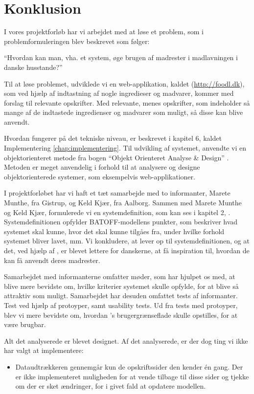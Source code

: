 \chapter{Konklusion}
\label{chap:konklusion}

I vores projektforløb har vi arbejdet med at løse et problem, som i problemformuleringen blev beskrevet som følger:

``Hvordan kan man, vha. et system, øge brugen af madrester i madlavningen i danske husstande?''

Til at løse problemet, udviklede vi en web-applikation, kaldet \Foodl{} (\url{http://foodl.dk}), som ved hjælp af indtastning af nogle ingredieser og
madvarer, kommer med forslag til relevante opskrifter. Med relevante, menes opskrifter, som indeholder så mange af de indtastede ingredienser
og madvarer som muligt, så disse kan blive anvendt.

Hvordan \Foodl{} fungerer på det tekniske niveau, er beskrevet i kapitel 6, kaldet Implementering \ref{chap:implementering}. Til udvikling af systemet, anvendte vi en objektorienteret metode fra bogen ``Objekt Orienteret Analyse \& Design'' \cite{ooad}. Metoden er meget anvendelig i forhold til at analysere og designe objektorienterede systemer, som eksempelvis web-applikationer. 

I projektforløbet har vi haft et tæt samarbejde med to informanter, Marete Munthe, fra Gistrup, og Keld Kjær, fra Aalborg. Sammen med Marete Munthe og Keld Kjær, formulerede vi en systemdefinition, som kan ses i kapitel 2, . Systemdefinitionen opfylder BATOFF-modellens punkter, som beskriver hvad systemet skal kunne, hvor det skal kunne tilgåes fra, under hvilke forhold systemet bliver lavet, mm. Vi konkludere, at \Foodl{} lever op til systemdefinitionen, og at det, ved hjælp af \Foodl{}, er blevet lettere for danskerne, at få inspiration til, hvordan de kan få anvendt deres madrester.

Samarbejdet med informanterne omfatter møder, som har hjulpet os med, at blive mere bevidste om, hvilke kriterier systemet skulle opfylde, for at blive så attraktiv som muligt. Samarbejdet har desuden omfattet tests af informanter. Test ved hjælp af protoyper, samt usability tests. Ud fra tests med protoyper, blev vi mere bevidste om, hvordan \Foodl{}'s brugergrænseflade skulle opstilles, for at være brugbar. 

Alt det analyserede er blevet designet. Af det analyserede, er der dog ting vi ikke har valgt at implementere:
\begin{itemize}
\item Dataudtrækkeren gennemgår kun de opskriftssider den kender én gang. Der er ikke implementeret muligheden for at vende tilbage til disse sider og tjekke om der er sket ændringer, for i givet fald at opdatere modellen.
\end{itemize}


